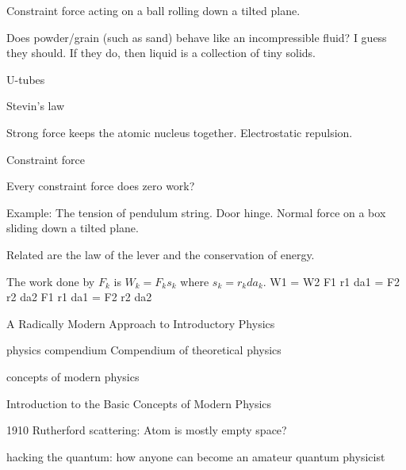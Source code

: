 Constraint force acting on a ball rolling down a tilted plane.

Does powder/grain (such as sand) behave like an incompressible fluid? I guess they should. If they do, then liquid is a collection of tiny solids.

U-tubes

Stevin's law







Strong force keeps the atomic nucleus together. Electrostatic repulsion.


Constraint force

Every constraint force does zero work?

Example: The tension of pendulum string. Door hinge. Normal force on a box sliding down a tilted plane.

Related are the law of the lever and the conservation of energy.

The work done by \(F_k\) is \(W_k = F_k s_k\) where \(s_k = r_k da_k\).
W1 = W2
F1 r1 da1 = F2 r2 da2
F1 r1 da1 = F2 r2 da2



\cite{dyson1972missed}



A Radically Modern Approach to Introductory Physics


physics compendium
Compendium of theoretical physics

concepts of modern physics

Introduction to the Basic Concepts of Modern Physics


1910 Rutherford scattering:
Atom is mostly empty space?

hacking the quantum:
how anyone can become an amateur quantum physicist


